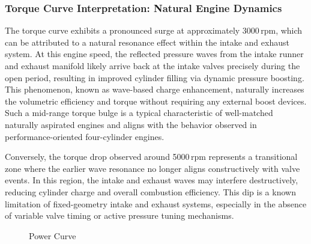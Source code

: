 \subsubsection{Torque Curve Interpretation: Natural Engine Dynamics}

The torque curve exhibits a pronounced surge at approximately 3000\,rpm, which can be attributed to a natural resonance effect within the intake and exhaust system. At this engine speed, the reflected pressure waves from the intake runner and exhaust manifold likely arrive back at the intake valves precisely during the open period, resulting in improved cylinder filling via dynamic pressure boosting. This phenomenon, known as wave-based charge enhancement, naturally increases the volumetric efficiency and torque without requiring any external boost devices. Such a mid-range torque bulge is a typical characteristic of well-matched naturally aspirated engines and aligns with the behavior observed in performance-oriented four-cylinder engines.

Conversely, the torque drop observed around 5000\,rpm represents a transitional zone where the earlier wave resonance no longer aligns constructively with valve events. In this region, the intake and exhaust waves may interfere destructively, reducing cylinder charge and overall combustion efficiency. This dip is a known limitation of fixed-geometry intake and exhaust systems, especially in the absence of variable valve timing or active pressure tuning mechanisms.

\begin{figure}[H]
    \centering
    \begin{minipage}{\textwidth}
        \centering
        \caption{ Power Curve}
        \label{fig:task2_power_detail}
    \end{minipage}
\end{figure}

